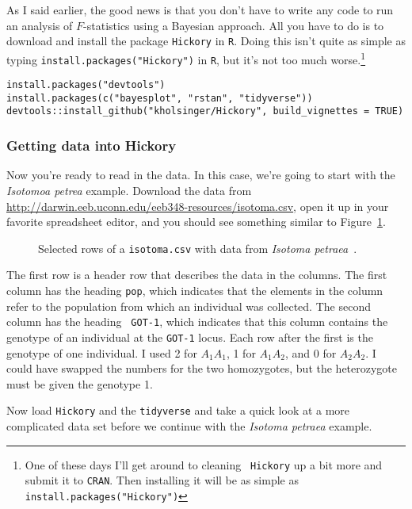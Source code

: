 As I said earlier, the good news is that you don't have to write any
code to run an analysis of $F$-statistics using a Bayesian
approach. All you have to do is to download and install the package
{\tt Hickory} in {\tt R}. Doing this isn't quite as simple as typing
{\tt install.packages("Hickory")} in {\tt R}, but it's not too much
worse.\footnote{One of these days I'll get around to cleaning {\tt
    Hickory} up a bit more and submit it to {\tt CRAN}. Then
  installing it will be as simple as {\tt
    install.packages("Hickory")}} 

\begin{verbatim}
install.packages("devtools")
install.packages(c("bayesplot", "rstan", "tidyverse"))
devtools::install_github("kholsinger/Hickory", build_vignettes = TRUE)
\end{verbatim}

\subsubsection*{Getting data into Hickory}

Now you're ready to read in the data. In this case, we're going to
start with the {\it Isotomoa petrea\/} example. Download the data from
\url{http://darwin.eeb.uconn.edu/eeb348-resources/isotoma.csv}, open
it up in your favorite spreadsheet editor, and you should see
something similar to Figure~\ref{fig:isotoma-csv}.

\begin{figure}
  \begin{center}
  \end{center}
\caption{Selected rows of a {\tt isotoma.csv} with data from {\it
    Isotoma petraea}~\cite{James-etal-1983}.}\label{fig:isotoma-csv}
\end{figure}

The first row is a header row that describes the data in the
columns. The first column has the heading {\tt pop}, which indicates
that the elements in the column refer to the population from which an
individual was collected. The second column has the heading {\tt
  GOT-1}, which indicates that this column contains the genotype of an
individual at the {\tt GOT-1} locus. Each row after the first is the
genotype of one individual. I used 2 for $A_1A_1$, 1 for $A_1A_2$, and
0 for $A_2A_2$. I could have swapped the numbers for the two
homozygotes, but the heterozygote must be given the genotype 1.

Now load {\tt Hickory} and the {\tt tidyverse} and take a quick look
at a more complicated data set before we continue with the {\it
  Isotoma petraea\/} example.


